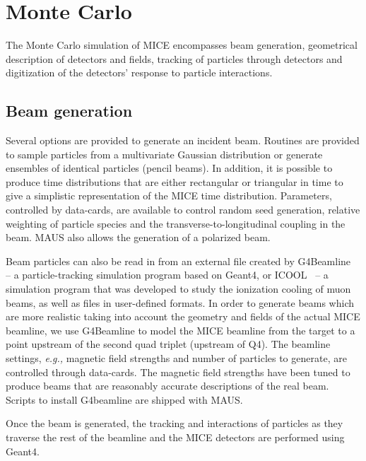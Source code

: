 \documentclass[11pt,a4paper]{article}
\begin{document}
\section{Monte Carlo}\label{sec:mc}
The Monte Carlo simulation of MICE encompasses beam generation, geometrical description of detectors  and fields, tracking of particles through detectors and digitization of the detectors' response to particle interactions. 

\subsection{Beam generation}\label{sec:beam}
Several options are provided to generate an incident beam.  Routines are provided to sample particles from a multivariate Gaussian distribution or generate ensembles of identical particles (pencil beams). In addition, it is possible to produce time distributions that are either rectangular or triangular in time to give a simplistic representation of the MICE time distribution. Parameters, controlled by data-cards, are available to control random seed generation,  relative weighting of particle species and the transverse-to-longitudinal coupling in the beam. MAUS also allows the generation of a polarized beam. 

Beam particles can also be read in from an external file created by G4Beamline~\cite{G4Beamline} -- a particle-tracking  simulation program based on Geant4, or ICOOL~\cite{ICOOL} -- a simulation program that was developed to study the ionization cooling of muon beams, as well as files in user-defined formats. In order to generate beams which are more realistic taking into account the geometry and fields of the actual MICE beamline, we use G4Beamline to model the MICE beamline from the target to a point upstream of the second quad triplet (upstream of Q4).  The beamline settings, \textit{e.g.,} magnetic field strengths and number of particles to generate, are controlled through data-cards. The magnetic field strengths have been tuned to produce beams that are reasonably accurate descriptions of the real beam. Scripts to install G4beamline are shipped with MAUS. 

Once the beam is generated, the tracking and interactions of particles as they traverse the rest of the beamline and the MICE detectors  are performed using Geant4.
\end{document}
